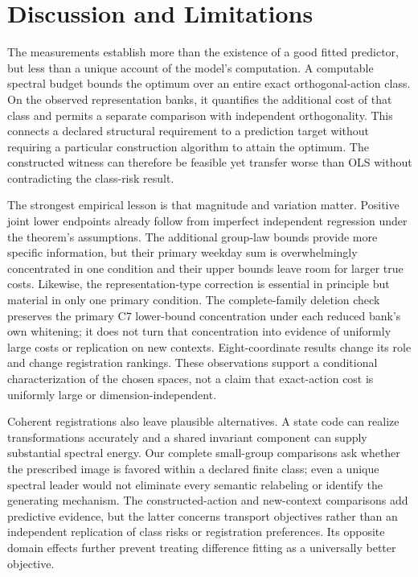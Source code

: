\section{Discussion and Limitations}
\label{sec:reading-protocol}
The measurements establish more than the existence of a good fitted predictor, but less than a unique account of the model's computation. A computable spectral budget bounds the optimum over an entire exact orthogonal-action class. On the observed representation banks, it quantifies the additional cost of that class and permits a separate comparison with independent orthogonality. This connects a declared structural requirement to a prediction target without requiring a particular construction algorithm to attain the optimum. The constructed witness can therefore be feasible yet transfer worse than OLS without contradicting the class-risk result.

The strongest empirical lesson is that magnitude and variation matter. Positive joint lower endpoints already follow from imperfect independent regression under the theorem's assumptions. The additional group-law bounds provide more specific information, but their primary weekday sum is overwhelmingly concentrated in one condition and their upper bounds leave room for larger true costs. Likewise, the representation-type correction is essential in principle but material in only one primary condition. The complete-family deletion check preserves the primary C7 lower-bound concentration under each reduced bank's own whitening; it does not turn that concentration into evidence of uniformly large costs or replication on new contexts. Eight-coordinate results change its role and change registration rankings. These observations support a conditional characterization of the chosen spaces, not a claim that exact-action cost is uniformly large or dimension-independent.

Coherent registrations also leave plausible alternatives. A state code can realize transformations accurately and a shared invariant component can supply substantial spectral energy. Our complete small-group comparisons ask whether the prescribed image is favored within a declared finite class; even a unique spectral leader would not eliminate every semantic relabeling or identify the generating mechanism. The constructed-action and new-context comparisons add predictive evidence, but the latter concerns transport objectives rather than an independent replication of class risks or registration preferences. Its opposite domain effects further prevent treating difference fitting as a universally better objective.

